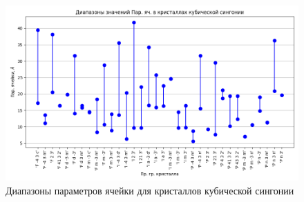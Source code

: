 \documentclass[12pt,a4paper, russian]{extarticle}
\begin{document}
\begin{figure}[H]
\includegraphics[scale=0.6]{plots_cell/cubic_syngony}
\caption{Диапазоны параметров ячейки для кристаллов кубической сингонии}
\end{figure}
\end{document}
